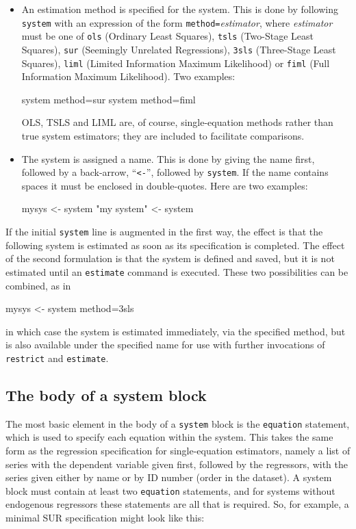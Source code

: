 \begin{itemize}
\item An estimation method is specified for the system. This is done
  by following \texttt{system} with an expression of the form
  \texttt{method=}\textsl{estimator}, where \textsl{estimator} must be
  one of \texttt{ols} (Ordinary Least Squares), \texttt{tsls}
  (Two-Stage Least Squares), \texttt{sur} (Seemingly Unrelated
  Regressions), \texttt{3sls} (Three-Stage Least Squares),
  \texttt{liml} (Limited Information Maximum Likelihood) or
  \texttt{fiml} (Full Information Maximum Likelihood). Two examples:
\begin{code}
system method=sur
system method=fiml
\end{code}
OLS, TSLS and LIML are, of course, single-equation methods rather than
true system estimators; they are included to facilitate comparisons.
\item The system is assigned a name. This is done by giving the name
  first, followed by a back-arrow, ``\verb|<-|'', followed by
  \texttt{system}.  If the name contains spaces it must be enclosed in
  double-quotes. Here are two examples:
\begin{code}
mysys <- system
"my system" <- system
\end{code}
\end{itemize}

If the initial \texttt{system} line is augmented in the first way, the
effect is that the following system is estimated as soon as its
specification is completed. The effect of the second formulation is
that the system is defined and saved, but it is not estimated until an
\texttt{estimate} command is executed. These two possibilities can be
combined, as in
\begin{code}
mysys <- system method=3sls
\end{code}
in which case the system is estimated immediately, via the specified
method, but is also available under the specified name for use with
further invocations of \texttt{restrict} and \texttt{estimate}.

\subsection{The body of a system block}

The most basic element in the body of a \texttt{system} block is the
\texttt{equation} statement, which is used to specify each equation
within the system. This takes the same form as the regression
specification for single-equation estimators, namely a list of series
with the dependent variable given first, followed by the regressors,
with the series given either by name or by ID number (order in the
dataset). A system block must contain at least two \texttt{equation}
statements, and for systems without endogenous regressors these
statements are all that is required. So, for example, a minimal
SUR specification might look like this:

